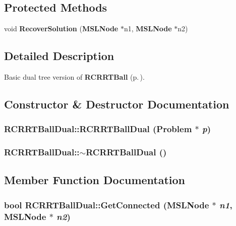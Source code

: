 \subsection*{Protected Methods}
\begin{CompactItemize}
\item 
void {\bf Recover\-Solution} ({\bf MSLNode} $\ast$n1, {\bf MSLNode} $\ast$n2)
\end{CompactItemize}


\subsection{Detailed Description}
Basic dual tree version of {\bf RCRRTBall} {\rm (p.\,\pageref{classRCRRTBall})}.



\subsection{Constructor \& Destructor Documentation}
\subsubsection{\setlength{\rightskip}{0pt plus 5cm}RCRRTBall\-Dual::RCRRTBall\-Dual ({\bf Problem} $\ast$ {\em p})}\label{classRCRRTBallDual_a0}


\subsubsection{\setlength{\rightskip}{0pt plus 5cm}RCRRTBall\-Dual::$\sim$RCRRTBall\-Dual ()\hspace{0.3cm}{\tt  [inline, virtual]}}\label{classRCRRTBallDual_a1}




\subsection{Member Function Documentation}
\subsubsection{\setlength{\rightskip}{0pt plus 5cm}bool RCRRTBall\-Dual::Get\-Connected ({\bf MSLNode} $\ast$ {\em n1}, {\bf MSLNode} $\ast$ {\em n2})\hspace{0.3cm}{\tt  [virtual]}}\label{classRCRRTBallDual_a3}



